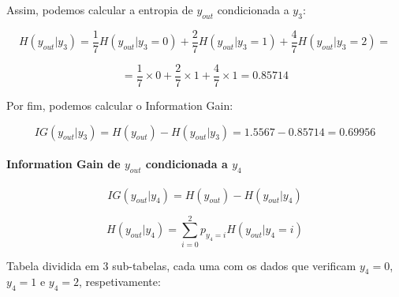 \documentclass{article}
\begin{document}
Assim, podemos calcular a entropia de $y_{out}$ condicionada a $y_3$:

\[ H(y_{out}|y_3) = \frac{1}{7} H(y_{out}|y_3 = 0) + \frac{2}{7} H(y_{out}|y_3 = 1) + \frac{4}{7} H(y_{out}|y_3 = 2) = \]

\[ = \frac{1}{7} \times 0 + \frac{2}{7} \times 1 + \frac{4}{7} \times 1 = 0.85714 \]

Por fim, podemos calcular o Information Gain:

\[ IG(y_{out}|y_3) = H(y_{out}) - H(y_{out}|y_3) = 1.5567 - 0.85714 = 0.69956 \]

\paragraph{Information Gain de $y_{out}$ condicionada a $y_4$}

\[ IG(y_{out}|y_4) = H(y_{out}) - H(y_{out}|y_4) \]

\[ H(y_{out}|y_4) = \sum_{i=0}^{2} p_{y_4 = i} H(y_{out}|y_4 = i) \]

Tabela dividida em 3 sub-tabelas, cada uma com os dados que verificam $y_4 = 0$, $y_4 = 1$ e $y_4 = 2$, respetivamente:
\end{document}
